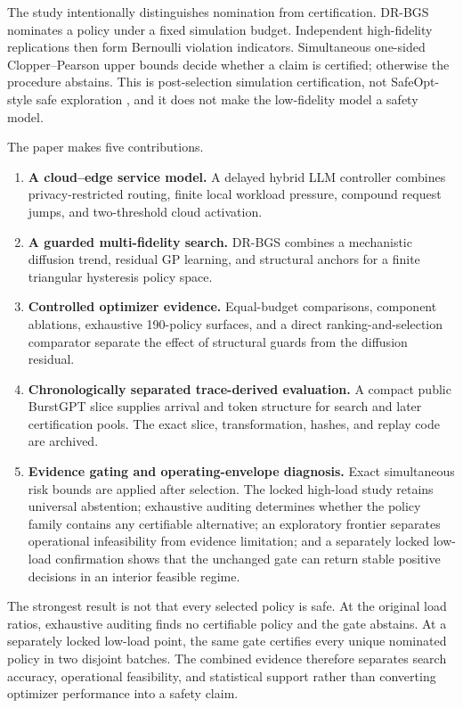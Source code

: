 \documentclass[preprint,12pt]{elsarticle}
\begin{document}
The study intentionally distinguishes nomination from certification. DR-BGS nominates a policy under a fixed simulation budget. Independent high-fidelity replications then form Bernoulli violation indicators. Simultaneous one-sided Clopper--Pearson upper bounds decide whether a claim is certified; otherwise the procedure abstains. This is post-selection simulation certification, not SafeOpt-style safe exploration \cite{sui2015safeopt}, and it does not make the low-fidelity model a safety model.

The paper makes five contributions.
\begin{enumerate}[leftmargin=*]
\item \textbf{A cloud--edge service model.} A delayed hybrid LLM controller combines privacy-restricted routing, finite local workload pressure, compound request jumps, and two-threshold cloud activation.
\item \textbf{A guarded multi-fidelity search.} DR-BGS combines a mechanistic diffusion trend, residual GP learning, and structural anchors for a finite triangular hysteresis policy space.
\item \textbf{Controlled optimizer evidence.} Equal-budget comparisons, component ablations, exhaustive 190-policy surfaces, and a direct ranking-and-selection comparator separate the effect of structural guards from the diffusion residual.
\item \textbf{Chronologically separated trace-derived evaluation.} A compact public BurstGPT slice supplies arrival and token structure for search and later certification pools. The exact slice, transformation, hashes, and replay code are archived.
\item \textbf{Evidence gating and operating-envelope diagnosis.} Exact simultaneous risk bounds are applied after selection. The locked high-load study retains universal abstention; exhaustive auditing determines whether the policy family contains any certifiable alternative; an exploratory frontier separates operational infeasibility from evidence limitation; and a separately locked low-load confirmation shows that the unchanged gate can return stable positive decisions in an interior feasible regime.
\end{enumerate}

The strongest result is not that every selected policy is safe. At the original load ratios, exhaustive auditing finds no certifiable policy and the gate abstains. At a separately locked low-load point, the same gate certifies every unique nominated policy in two disjoint batches. The combined evidence therefore separates search accuracy, operational feasibility, and statistical support rather than converting optimizer performance into a safety claim.
\end{document}
